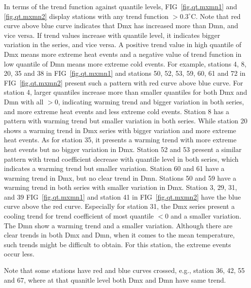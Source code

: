 \documentclass[fleqn,10pt]{wlscirep}
\newcommand{\dc}[1]{#1^{ \circ}\mathrm{C}}
\begin{document}
In terms of the trend function against quantile levels, FIG~\ref{fig.qt.mxmn1} and \ref{fig.qt.mxmn2} display stations with any trend function $>\dc{0.3}$. Note that red curve above blue curve indicates that Dmx has increased more than Dmn, and vice versa.  If trend values increase with quantile level, it indicates bigger variation in the series, and vice versa. A positive trend value in high quantile of Dmx means more extreme heat events and a negative value of trend function in low quantile of Dmn means more extreme cold events.
For example, stations 4, 8, 20, 35 and 38 in FIG~\ref{fig.qt.mxmn1} and stations 50, 52, 53, 59, 60, 61 and 72 in FIG~\ref{fig.qt.mxmn2} present such a pattern with red curve above blue curve. For station 4, larger quantiles increase more than smaller quantiles for both Dmx and Dmn with all $>0$, indicating warming trend and bigger variation in both series, and more extreme heat events and less extreme cold events.  Station 8 has a pattern with warming trend but smaller variation in both series. While station 20 shows a warming trend in Dmx series with bigger variation and more extreme heat events. As for station 35, it presents a warming trend with more extreme heat events but no bigger variation in Dmx.  Station 52 and 53 present a similar pattern with trend coefficient decrease with quantile level in both series, which indicates a warming trend but smaller variation.  Station 60 and 61 have a warming trend in Dmx, but no clear trend in Dmn. Stations 50 and 59 have a warming trend in both series with smaller variation in Dmx.
Station 3, 29, 31, and 39  FIG~\ref{fig.qt.mxmn1} and  station 41 in FIG~\ref{fig.qt.mxmn2} have the blue curve above the red curve. Especially for station 31, the Dmx series present a cooling trend for trend coefficient of most quantile $<0$ and a smaller variation. The Dmn show a warming trend and a smaller variation.  Although there are clear trends in both Dmx and Dmn, when it comes to the mean temperature, such trends might be difficult to obtain. For this station, the extreme events occur less.

Note that some stations have red and blue curves crossed, e.g., station 36, 42, 55 and 67, where at that quanitle level both Dmx and Dmn have same trend.


\end{document}
